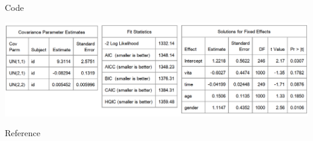\documentclass[9pt, xelatex]{beamer}
\begin{document}
{\begin{frame}[allowframebreaks]{Code}
		\framebreak
	
		\begin{center}
			\includegraphics[scale=0.4]{sasfit2.png} 
		\end{center}

		
	\end{frame}
} 
	
\begin{frame}[allowframebreaks]{Reference}
	\nocite{*} %
	
\end{frame}
\end{document}
